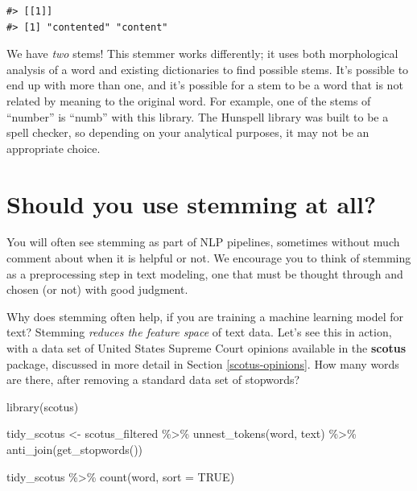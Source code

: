 \documentclass[
]{krantz}
\makeatletter
\newenvironment{Shaded}{\begin{snugshade}}{\end{snugshade}}
\newcommand{\AttributeTok}[1]{\textcolor[rgb]{0.77,0.63,0.00}{#1}}
\newcommand{\ConstantTok}[1]{\textcolor[rgb]{0.00,0.00,0.00}{#1}}
\newcommand{\FunctionTok}[1]{\textcolor[rgb]{0.00,0.00,0.00}{#1}}
\newcommand{\NormalTok}[1]{#1}
\newcommand{\OtherTok}[1]{\textcolor[rgb]{0.56,0.35,0.01}{#1}}
\newcommand{\SpecialCharTok}[1]{\textcolor[rgb]{0.00,0.00,0.00}{#1}}
\newenvironment{kframe}{%
\medskip{}
\setlength{\fboxsep}{.8em}
 \def\at@end@of@kframe{}%
 \ifinner\ifhmode%
  \def\at@end@of@kframe{\end{minipage}}%
  \begin{minipage}{\columnwidth}%
 \fi\fi%
 \def\FrameCommand##1{\hskip\@totalleftmargin \hskip-\fboxsep
 \colorbox{shadecolor}{##1}\hskip-\fboxsep
     \hskip-\linewidth \hskip-\@totalleftmargin \hskip\columnwidth}%
 \MakeFramed {\advance\hsize-\width
   \@totalleftmargin\z@ \linewidth\hsize
   \@setminipage}}%
 {\par\unskip\endMakeFramed%
 \at@end@of@kframe}
\renewenvironment{Shaded}{\begin{kframe}}{\end{kframe}}
\makeatother
\begin{document}
\begin{verbatim}
#> [[1]]
#> [1] "contented" "content"
\end{verbatim}

We have \emph{two} stems! This stemmer works differently; it uses both morphological analysis of a word and existing dictionaries to find possible stems. It's possible to end up with more than one, and it's possible for a stem to be a word that is not related by meaning to the original word. For example, one of the stems of ``number'' is ``numb'' with this library. The Hunspell library was built to be a spell checker, so depending on your analytical purposes, it may not be an appropriate choice.

\hypertarget{should-you-use-stemming-at-all}{%
\section{Should you use stemming at all?}\label{should-you-use-stemming-at-all}}

You will often see stemming as part of NLP pipelines, sometimes without much comment about when it is helpful or not. We encourage you to think of stemming as a preprocessing step in text modeling, one that must be thought through and chosen (or not) with good judgment.

Why does stemming often help, if you are training a machine learning model for text? Stemming \emph{reduces the feature space} of text data. Let's see this in action, with a data set of United States Supreme Court opinions available in the \textbf{scotus} package, discussed in more detail in Section \ref{scotus-opinions}. How many words are there, after removing a standard data set of stopwords?

\begin{Shaded}
\begin{Highlighting}[]
\FunctionTok{library}\NormalTok{(scotus)}

\NormalTok{tidy\_scotus }\OtherTok{\textless{}{-}}\NormalTok{ scotus\_filtered }\SpecialCharTok{\%\textgreater{}\%}
  \FunctionTok{unnest\_tokens}\NormalTok{(word, text) }\SpecialCharTok{\%\textgreater{}\%}
  \FunctionTok{anti\_join}\NormalTok{(}\FunctionTok{get\_stopwords}\NormalTok{())}

\NormalTok{tidy\_scotus }\SpecialCharTok{\%\textgreater{}\%}
  \FunctionTok{count}\NormalTok{(word, }\AttributeTok{sort =} \ConstantTok{TRUE}\NormalTok{)}
\end{Highlighting}
\end{Shaded}
\end{document}
